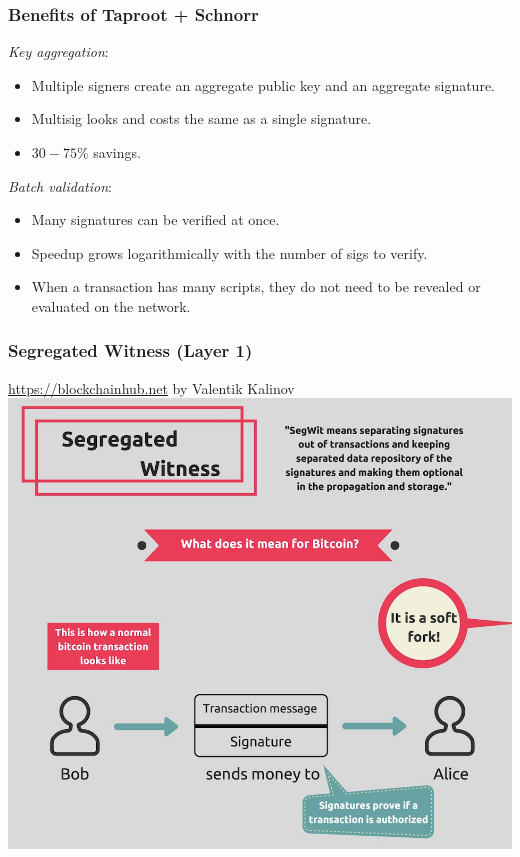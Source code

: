 \documentclass{beamer}
\begin{document}
\begin{frame}
  \frametitle{Benefits of Taproot + Schnorr}
	\begin{block}{\emph{Key aggregation}:}
	\begin{itemize}
		\item Multiple signers create an aggregate public key and an aggregate signature. \pause
		\item Multisig looks and costs the same as a single signature. \pause
		\item $30-75\%$ savings. 
	\end{itemize}
	\end{block}
	\pause
	\begin{block}{\emph{Batch validation}:}
	\begin{itemize}
		\item Many signatures can be verified at once. \pause
		\item Speedup grows logarithmically with the number of sigs to verify. \pause
		\item When a transaction has many scripts, they do not need to be revealed or evaluated on the network. 
	\end{itemize}
	\end{block}
\end{frame}
\begin{frame}
  \frametitle{Segregated Witness (Layer 1)}
{\tiny{\url{https://blockchainhub.net} by Valentik Kalinov}}
 	\centering
	\includegraphics[scale=0.45]{segwit1}
\end{frame}
\end{document}
